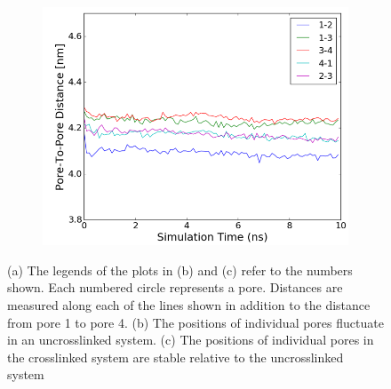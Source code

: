 \documentclass{article}
\begin{document}
\begin{figure}[!ht]
\begin{subfigure}{0.31\textwidth}
		\centering
		\includegraphics[width=\textwidth]{xlink_p2p.png}
		\caption{}\label{fig:xlink_p2p}
	\end{subfigure}
	\caption{(a) The legends of the plots in (b) and (c) refer to the numbers shown.
	Each numbered circle represents a pore. Distances are measured along each of the 
	lines shown in addition to the distance from pore 1 to pore 4. (b) The positions
	of individual pores fluctuate in an uncrosslinked system. (c) The positions of
	individual pores in the crosslinked system are stable relative to the uncrosslinked
	system}\label{fig:xlink}
  \end{figure}

\clearpage

\end{document}
